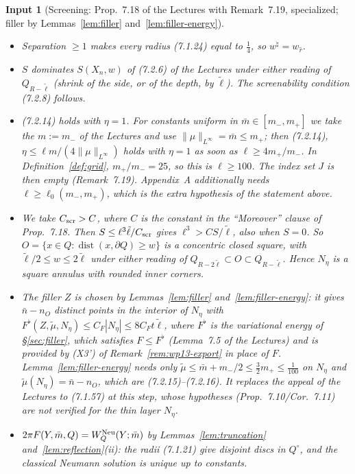 \documentclass[11pt]{article}
\newtheorem{citedinput}[theorem]{Input}
\theoremstyle{definition}
\theoremstyle{remark}
\begin{document}
\begin{citedinput}[Screening: Prop.~7.18 of the Lectures with Remark~7.19, specialized; filler by Lemmas~\ref{lem:filler} and~\ref{lem:filler-energy}]
\begin{itemize}[leftmargin=*]
\item Separation $\ge1$ makes every radius (7.1.24) equal to $\tfrac14$, so $w^\natural=w_{\hat r}$.
\item $S$ dominates $S(X_n,w)$ of (7.2.6) of the Lectures under either reading of $Q_{R-\tilde\ell}$
  (shrink of the side, or of the depth, by $\tilde\ell$). The screenability condition (7.2.8)
  follows.
\item (7.2.14) holds with $\eta=1$. For constants uniform in $\bar m\in[m_-,m_+]$ we take the
  $m:=m_-$ of the Lectures and use $\|\mu\|_{L^\infty}=\bar m\le m_+$; then (7.2.14), $\eta\le\ell m/(4\|\mu\|_{L^\infty})$
  holds with $\eta=1$ as soon as $\ell\ge4m_+/m_-$. In
  Definition~\ref{def:grid}, $m_+/m_-=25$, so this is $\ell\ge100$. The index set $J$ is then empty
  (Remark~7.19). Appendix~A additionally needs $\ell\ge\ell_0(m_-,m_+)$, which is the extra hypothesis
  of the statement above.
\item We take $C_{\rm scr}>C$, where $C$ is the constant in the ``Moreover'' clause of Prop.~7.18. Then $S\le\ell^3\tilde\ell/C_{\rm scr}$ gives
  $\ell^3>CS/\tilde\ell$, also when $S=0$. So $O=\{x\in Q:\operatorname{dist}(x,\partial Q)\ge w\}$ is a
  concentric closed square, with $\tilde\ell/2\le w\le2\tilde\ell$ under either reading of
  $Q_{R-2\tilde\ell}\subset O\subset Q_{R-\tilde\ell}$. Hence $N_\eta$ is a square annulus with rounded
  inner corners.
\item The filler $Z$ is chosen by Lemmas~\ref{lem:filler} and~\ref{lem:filler-energy}: it gives $\bar n-n_O$ distinct points in the
  interior of $N_\eta$ with $F^\flat(Z,\tilde\mu,N_\eta)\le C_F|N_\eta|\le 8C_Ft\tilde\ell$, where $F^\flat$
  is the variational energy of \S\ref{sec:filler}, which satisfies $F\le F^\flat$ (Lemma~7.5 of the Lectures) and is
  provided by (X3') of Remark~\ref{rem:wp13-export} in place of $F$. Lemma~\ref{lem:filler-energy}
  needs only $\tilde\mu\le\bar m+m_-/2\le\tfrac32m_+\le\tfrac1{100}$ on $N_\eta$ and
  $\tilde\mu(N_\eta)=\bar n-n_O$, which are (7.2.15)--(7.2.16). It replaces the appeal of the Lectures to
  (7.1.57) at this step, whose hypotheses (Prop.~7.10/Cor.~7.11) are not
  verified for the thin layer $N_\eta$.
\item $2\pi F(Y,\bar m,Q)=W^{\rm Neu}_Q(Y;\bar m)$ by Lemmas~\ref{lem:truncation}
  and~\ref{lem:reflection}(ii): the radii (7.1.21) give disjoint discs in $Q^\circ$, and the
  classical Neumann solution is unique up to constants.
\end{itemize}
\end{citedinput}
\end{document}
